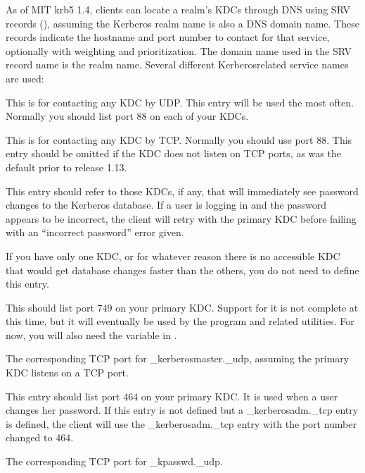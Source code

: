 \documentclass[letterpaper,10pt,english]{sphinxmanual}
\begin{document}
\sphinxAtStartPar
As of MIT krb5 1.4, clients can locate a realm’s KDCs through DNS
using SRV records (), assuming the Kerberos realm name is
also a DNS domain name.  These records indicate the hostname and port
number to contact for that service, optionally with weighting and
prioritization.  The domain name used in the SRV record name is the
realm name.  Several different Kerberos\sphinxhyphen{}related service names are
used:
\begin{description}
\sphinxAtStartPar
This is for contacting any KDC by UDP.  This entry will be used
the most often.  Normally you should list port 88 on each of your
KDCs.

\sphinxAtStartPar
This is for contacting any KDC by TCP.  Normally you should use
port 88.  This entry should be omitted if the KDC does not listen
on TCP ports, as was the default prior to release 1.13.

\sphinxAtStartPar
This entry should refer to those KDCs, if any, that will
immediately see password changes to the Kerberos database.  If a
user is logging in and the password appears to be incorrect, the
client will retry with the primary KDC before failing with an
“incorrect password” error given.

\sphinxAtStartPar
If you have only one KDC, or for whatever reason there is no
accessible KDC that would get database changes faster than the
others, you do not need to define this entry.

\sphinxAtStartPar
This should list port 749 on your primary KDC.  Support for it is
not complete at this time, but it will eventually be used by the
{\hyperref[\detokenize{admin/admin_commands/kadmin_local:kadmin-1}]{}} program and related utilities.  For now, you will
also need the  variable in {\hyperref[\detokenize{admin/conf_files/krb5_conf:krb5-conf-5}]{}}.

\sphinxAtStartPar
The corresponding TCP port for \_kerberos\sphinxhyphen{}master.\_udp, assuming the
primary KDC listens on a TCP port.

\sphinxAtStartPar
This entry should list port 464 on your primary KDC.  It is used
when a user changes her password.  If this entry is not defined
but a \_kerberos\sphinxhyphen{}adm.\_tcp entry is defined, the client will use the
\_kerberos\sphinxhyphen{}adm.\_tcp entry with the port number changed to 464.

\sphinxAtStartPar
The corresponding TCP port for \_kpasswd.\_udp.

\end{description}
\end{document}
